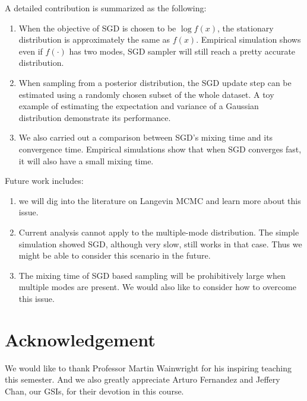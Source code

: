 \documentclass[preprint,12pt,3p]{elsarticle}
\begin{document}
A detailed contribution is summarized as the following:
\begin{enumerate}
    \item When the objective of SGD is chosen to be $\log f(x)$, the stationary distribution is approximately the same as $f(x)$. Empirical simulation shows even if $f(\cdot)$ has two modes, SGD sampler will still reach a pretty accurate distribution.
    \item When sampling from a posterior distribution, the SGD update step can be estimated using a randomly chosen subset of the whole dataset. A toy example of estimating the expectation and variance of a Gaussian distribution demonstrate its performance.
    \item We also carried out a comparison between SGD's mixing time and its convergence time. Empirical simulations show that when SGD converges fast, it will also have a small mixing time.
\end{enumerate}
Future work includes:
\begin{enumerate}
    \item we will dig into the literature on Langevin MCMC and learn more about this issue.
    \item Current analysis cannot apply to the multiple-mode distribution. The simple simulation showed SGD, although very slow, still works in that case. Thus we might be able to consider this scenario in the future.
    \item The mixing time of SGD based sampling will be prohibitively large when multiple modes are present. We would also like to consider how to overcome this issue.
\end{enumerate}

\section{Acknowledgement}

We would like to thank Professor Martin Wainwright for his inspiring teaching this semester. And we also greatly appreciate Arturo Fernandez and Jeffery Chan, our GSIs, for their devotion in this course.

\appendix
\tiny





\end{document}
